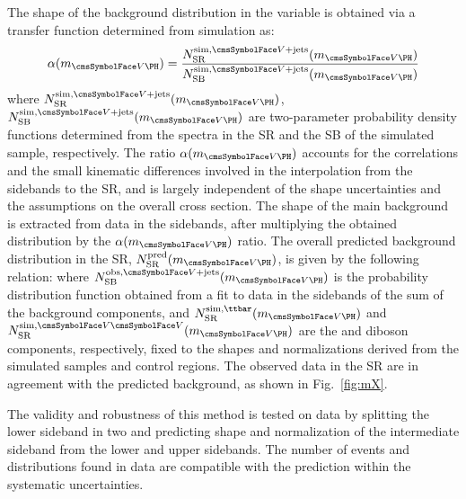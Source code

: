 The shape of the \Vjets background distribution in the \mVH variable is obtained via a transfer function determined from simulation as:
\begin{equation}
\alpha(\mVH) = \frac{N_\mathrm{SR}^{\text{sim},\Vjets}(\mVH)}{N_\mathrm{SB}^{\text{sim},\Vjets}(\mVH)}
\end{equation}
where $N_\mathrm{SR}^{\text{sim},\Vjets}(\mVH)$, $N_\mathrm{SB}^{\text{sim},\Vjets}(\mVH)$ are two-parameter probability density functions 
determined from the \mVH spectra in the SR and the SB of the simulated \Vjets sample, respectively. The ratio $\alpha(\mVH)$ accounts for 
the correlations and the small kinematic differences involved in the interpolation from the sidebands to the SR, and is largely independent 
of the shape uncertainties and the assumptions on the overall cross section.
The shape of the main background is extracted from data in the \mj sidebands, after multiplying the obtained distribution by the 
$\alpha(\mVH)$ ratio. The overall predicted background distribution in the SR, $N_\mathrm{SR}^\text{pred}(\mVH)$, is given by the 
following relation:
where $N_\mathrm{SB}^\text{obs,\Vjets}(\mVH)$ is the probability distribution function obtained from a fit to data in the \mj sidebands of 
the sum of the background components, and $N_\mathrm{SR}^\text{sim,\ttbar}(\mVH)$ and $N_\mathrm{SR}^\text{sim,\VV}(\mVH)$ are the \ttbar 
and diboson components, respectively, fixed to the shapes and normalizations derived from the simulated samples and control regions.
The observed data in the SR are in agreement with the predicted background, as shown in Fig.~\ref{fig:mX}.

The validity and robustness of this method is tested on data by splitting the lower \mj sideband in two and predicting shape and 
normalization of the intermediate sideband from the lower and upper sidebands. The number of events and distributions found in data are 
compatible with the prediction within the systematic uncertainties.

